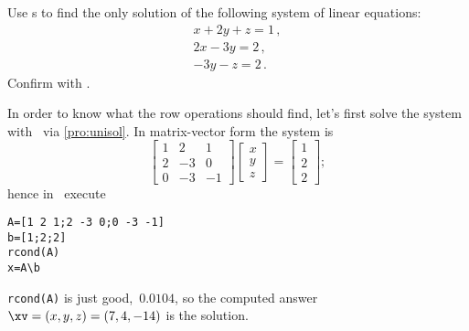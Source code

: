 \begin{example} \label{eg:erowops}
Use s to find the only solution of the following system of linear equations:
\begin{equation*}
\begin{array}{l}
x+2y+z=1\,,\\ 2x-3y=2\,,\\ -3y-z=2\,.
\end{array}
\end{equation*}
Confirm with \script.
\begin{solution} 
In order to know what the row operations should find, let's first solve the system with \script\ via \cref{pro:unisol}. 
In matrix-vector form the system is
\begin{equation*}
\begin{bmatrix} 1&2&1\\2&-3&0\\0&-3&-1 \end{bmatrix}
\begin{bmatrix} x\\y\\z \end{bmatrix}
=\begin{bmatrix} 1\\2\\2 \end{bmatrix};
\end{equation*}
hence in \script\ execute
\begin{verbatim}
A=[1 2 1;2 -3 0;0 -3 -1]
b=[1;2;2]
rcond(A)
x=A\b
\end{verbatim}
\setbox\ajrqrbox\hbox{}%
\marginajrbox%
\verb|rcond(A)| is just good,~\(0.0104\), so the computed answer \(\xv=(x,y,z)=(7,4,-14)\) is the solution.


\end{solution}
\end{example}
